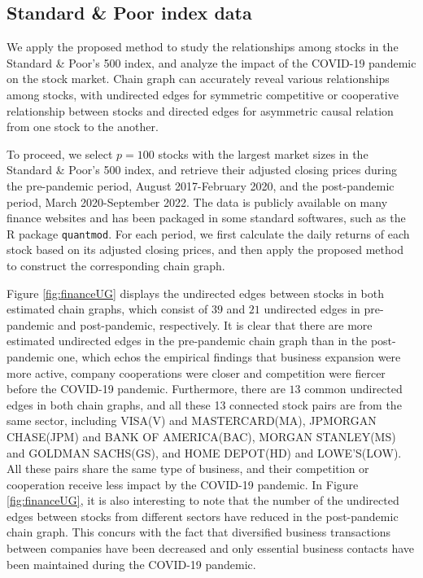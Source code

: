 \documentclass[12pt]{article}
\newcommand{\1}{\uppercase\expandafter{\romannumeral1}}
\newcommand{\2}{\uppercase\expandafter{\romannumeral2}}
\newcommand{\0}{\textbf{0}}
\begin{document}

\subsection{Standard \& Poor index data}

We apply the proposed method to study the relationships among stocks in the Standard \& Poor's 500 index, and analyze the impact of the COVID-19 pandemic on the stock market. Chain graph can accurately reveal various relationships among stocks, with undirected edges for symmetric competitive or cooperative relationship between stocks and directed edges for asymmetric causal relation from one stock to the another. %

To proceed, we select $p = 100$ stocks with the largest market sizes in the Standard \& Poor's 500 index, and retrieve their adjusted closing prices during the pre-pandemic period, August 2017-February 2020, and the post-pandemic period, March 2020-September 2022.  The data is publicly available on many finance websites and has been packaged in some standard softwares, such as the R package \texttt{quantmod}. For each period, we first calculate the daily returns of each stock based on its adjusted closing prices, and then apply the proposed method to construct the corresponding chain graph. 

Figure \ref{fig:financeUG} displays the undirected edges between stocks in both estimated chain graphs, which consist of $39$ and $21$ undirected edges in pre-pandemic and post-pandemic, respectively. It is clear that 
there are more estimated undirected edges in the 
pre-pandemic chain graph than in the post-pandemic one, which echos the empirical findings that business expansion were more active, company cooperations were closer and competition were fiercer before the COVID-19 pandemic. Furthermore, there are $13$ common undirected edges in both chain graphs, and all these 13 connected stock pairs are from the same sector, including VISA(V) and MASTERCARD(MA), JPMORGAN CHASE(JPM) and BANK OF AMERICA(BAC), MORGAN STANLEY(MS) and GOLDMAN SACHS(GS), and HOME DEPOT(HD) and LOWE'S(LOW).  All these pairs share the same type of business, and their competition or cooperation receive less impact by the COVID-19 pandemic. In Figure \ref{fig:financeUG}, it is also interesting to note that the number of the undirected edges between stocks from different sectors have reduced in the post-pandemic chain graph. This concurs with the fact that diversified business transactions between companies have been decreased and only essential business contacts have been maintained during the COVID-19 pandemic.
\end{document}
